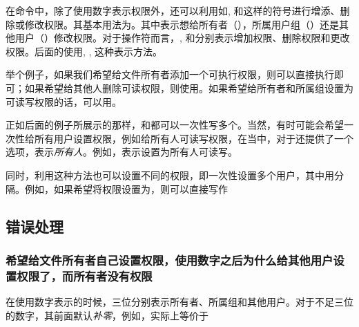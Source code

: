在命令中，除了使用数字表示权限外，还可以利用如\code{+}, \code{-}和\code{=}这样的符号进行增添、删除或修改权限。其基本用法为。其中\code{[用户]}表示想给所有者（），所属用户组（）还是其他用户（）修改权限。对于操作符而言，\code{+}, \code{-}和\code{=}分别表示增加权限、删除权限和更改权限。后面的使用, , 这种表示方法。

举个例子，如果我们希望给文件所有者添加一个可执行权限，则可以直接执行即可；如果希望给其他人删除可读权限，则使用。如果希望给所有者和所属组设置为可读写权限的话，可以用。

\begin{attention}
    正如后面的例子所展示的那样，\code{[用户]}和都可以一次性写多个。当然，有时可能会希望一次性给所有用户设置权限，例如给所有人可读写权限，在当中，对于\code{[用户]}还提供了一个选项，表示\emph{所有人}。例如，表示设置为所有人可读写。

    同时，利用这种方法也可以设置不同的权限，即一次性设置多个用户，其中用\code{,}分隔。例如，如果希望将权限设置为，则可以直接写作
\end{attention}






\subsection{错误处理}\label{subsec:文件权限管理-错误处理}

\subsubsection{希望给文件所有者自己设置权限，使用数字之后为什么给其他用户设置权限了，而所有者没有权限}

在使用数字表示的时候，三位分别表示所有者、所属组和其他用户。对于不足三位的数字，其前面默认\emph{补零}，例如，实际上等价于

